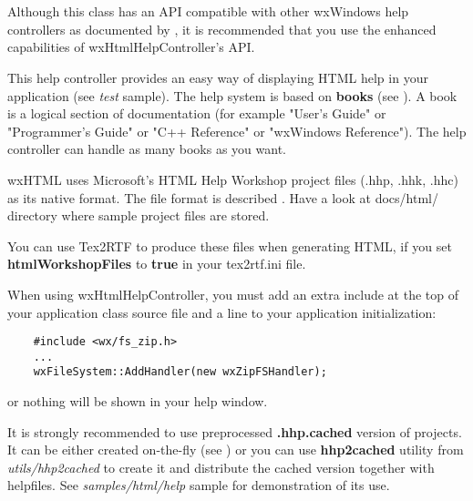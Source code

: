 %
%

\section{}\label{wxhtmlhelpcontroller}

Although this class has an API compatible with other wxWindows
help controllers as documented by , it
is recommended that you use the enhanced capabilities of wxHtmlHelpController's API.

This help controller provides an easy way of displaying HTML help in your
application (see {\it test} sample). The help system is based on {\bf books} 
(see ). A book is a logical
section of documentation (for example "User's Guide" or "Programmer's Guide" or
"C++ Reference" or "wxWindows Reference"). The help controller can handle as
many books as you want.

wxHTML uses Microsoft's HTML Help Workshop project files (.hhp, .hhk, .hhc) as its
native format. The file format is described .
Have a look at docs/html/ directory where sample project files are stored.

You can use Tex2RTF to produce these files when generating HTML, if you set {\bf htmlWorkshopFiles} to {\bf true} in
your tex2rtf.ini file.

When using wxHtmlHelpController, you must add an extra include at the top of your
application class source file and a line to your application initialization:

\begin{verbatim}
    #include <wx/fs_zip.h>
    ...
    wxFileSystem::AddHandler(new wxZipFSHandler);
\end{verbatim}

or nothing will be shown in your help window.


It is strongly recommended to use preprocessed {\bf .hhp.cached} version of
projects. It can be either created on-the-fly (see 
) or you can use 
{\bf hhp2cached} utility from {\it utils/hhp2cached} to create it and
distribute the cached version together with helpfiles. See {\it samples/html/help} 
sample for demonstration of its use.


